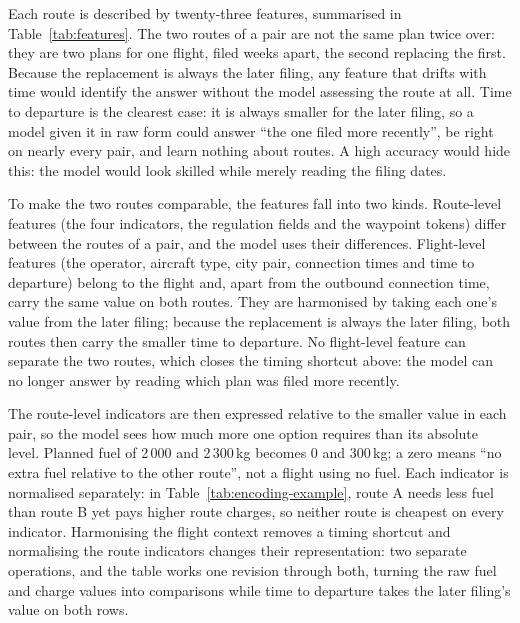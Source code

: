 \documentclass[a4paper,conference]{IEEEtran}
\begin{document}
Each route is described by twenty-three features, summarised in
Table~\ref{tab:features}. The two routes of a pair are not the same plan
twice over: they are two plans for one flight, filed weeks apart, the second
replacing the first. Because the replacement is always the later filing, any
feature that drifts with time would identify the answer without the model
assessing the route at all. Time to departure is the clearest case: it is
always smaller for the later filing, so a model given it in raw form could
answer ``the one filed more recently'', be right on nearly every pair, and
learn nothing about routes. A high accuracy would hide this: the model
would look skilled while merely reading the filing dates.

To make the two routes comparable, the features fall into two kinds.
Route-level features (the four indicators, the regulation fields and the
waypoint tokens) differ between the routes of a pair, and the model uses
their differences. Flight-level features (the operator, aircraft type, city
pair, connection times and time to departure) belong to the flight and,
apart from the outbound connection time, carry the same value on both routes.
They are harmonised by taking each one's value from the later filing; because
the replacement is always the later filing, both routes then carry the
smaller time to departure. No flight-level feature can separate the two
routes, which closes the timing shortcut above: the model can no longer
answer by reading which plan was filed more recently.

The route-level indicators are then expressed relative to the smaller
value in each pair, so the model sees how much more one option requires than
its absolute level. Planned fuel of 2\,000 and 2\,300\,kg becomes 0 and
300\,kg; a zero means ``no extra fuel relative to the other route'', not a
flight using no fuel. Each indicator is normalised separately: in
Table~\ref{tab:encoding-example}, route A needs less fuel than route B yet
pays higher route charges, so neither route is cheapest on every indicator.
Harmonising the flight context removes a timing shortcut and normalising the
route indicators changes their representation: two separate operations, and
the table works one revision through both, turning the raw fuel and charge
values into comparisons while time to departure takes the later filing's value
on both rows.
\end{document}
